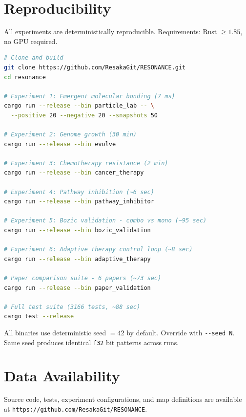 \documentclass[11pt,a4paper]{article}
\begin{document}
\section*{Reproducibility}
\label{sec:reproducibility}

All experiments are deterministically reproducible.
Requirements: Rust $\geq 1.85$, no GPU required.

\begin{lstlisting}[language=bash,caption={Commands to reproduce all experiments.}]
# Clone and build
git clone https://github.com/ResakaGit/RESONANCE.git
cd resonance

# Experiment 1: Emergent molecular bonding (7 ms)
cargo run --release --bin particle_lab -- \
  --positive 20 --negative 20 --snapshots 50

# Experiment 2: Genome growth (30 min)
cargo run --release --bin evolve

# Experiment 3: Chemotherapy resistance (2 min)
cargo run --release --bin cancer_therapy

# Experiment 4: Pathway inhibition (~6 sec)
cargo run --release --bin pathway_inhibitor

# Experiment 5: Bozic validation - combo vs mono (~95 sec)
cargo run --release --bin bozic_validation

# Experiment 6: Adaptive therapy control loop (~8 sec)
cargo run --release --bin adaptive_therapy

# Paper comparison suite - 6 papers (~73 sec)
cargo run --release --bin paper_validation

# Full test suite (3166 tests, ~88 sec)
cargo test --release
\end{lstlisting}

All binaries use deterministic seed $= 42$ by default.
Override with \texttt{-{}-seed N}. Same seed produces
identical \texttt{f32} bit patterns across runs.

\section*{Data Availability}

Source code, tests, experiment configurations, and
map definitions are available at \texttt{https://github.com/ResakaGit/RESONANCE}.


\end{document}

